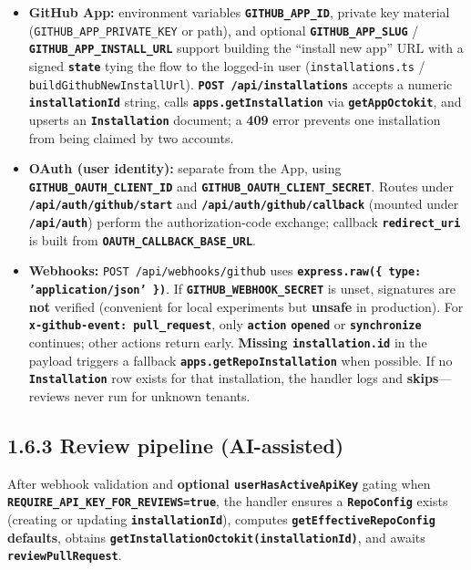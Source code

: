 \documentclass[11pt,a4paper]{report}
\begin{document}
\begin{itemize}
\item \textbf{GitHub App:} environment variables \textbf{\texttt{GITHUB\_APP\_ID}}, private key material (\texttt{GITHUB\_APP\_PRIVATE\_KEY} or path), and optional \textbf{\texttt{GITHUB\_APP\_SLUG}} / \textbf{\texttt{GITHUB\_APP\_INSTALL\_URL}} support building the “install new app” URL with a signed \textbf{\texttt{state}} tying the flow to the logged-in user (\texttt{installations.ts} / \texttt{buildGithubNewInstallUrl}). \textbf{\texttt{POST /api/installations}} accepts a numeric \textbf{\texttt{installationId}} string, calls \textbf{\texttt{apps.getInstallation}} via \textbf{\texttt{getAppOctokit}}, and upserts an \textbf{\texttt{Installation}} document; a \textbf{409} error prevents one installation from being claimed by two accounts.
\item \textbf{OAuth (user identity):} separate from the App, using \textbf{\texttt{GITHUB\_OAUTH\_CLIENT\_ID}} and \textbf{\texttt{GITHUB\_OAUTH\_CLIENT\_SECRET}}. Routes under \textbf{\texttt{/api/auth/github/start}} and \textbf{\texttt{/api/auth/github/callback}} (mounted under \textbf{\texttt{/api/auth}}) perform the authorization-code exchange; callback \textbf{\texttt{redirect\_uri}} is built from \textbf{\texttt{OAUTH\_CALLBACK\_BASE\_URL}}.
\item \textbf{Webhooks:} \texttt{POST /api/webhooks/github} uses \textbf{\texttt{express.raw(\{ type: 'application/json' \})}}. If \textbf{\texttt{GITHUB\_WEBHOOK\_SECRET}} is unset, signatures are \textbf{not} verified (convenient for local experiments but \textbf{unsafe} in production). For \textbf{\texttt{x-github-event: pull\_request}}, only \textbf{\texttt{action}} \textbf{\texttt{opened}} or \textbf{\texttt{synchronize}} continues; other actions return early. \textbf{Missing \texttt{installation.id}} in the payload triggers a fallback \textbf{\texttt{apps.getRepoInstallation}} when possible. If no \textbf{\texttt{Installation}} row exists for that installation, the handler logs and \textbf{skips}—reviews never run for unknown tenants.
\end{itemize}


\subsection{1.6.3 Review pipeline (AI-assisted)}


After webhook validation and \textbf{optional \texttt{userHasActiveApiKey}} gating when \textbf{\texttt{REQUIRE\_API\_KEY\_FOR\_REVIEWS=true}}, the handler ensures a \textbf{\texttt{RepoConfig}} exists (creating or updating \textbf{\texttt{installationId}}), computes \textbf{\texttt{getEffectiveRepoConfig} defaults}, obtains \textbf{\texttt{getInstallationOctokit(installationId)}}, and awaits \textbf{\texttt{reviewPullRequest}}.
\end{document}
